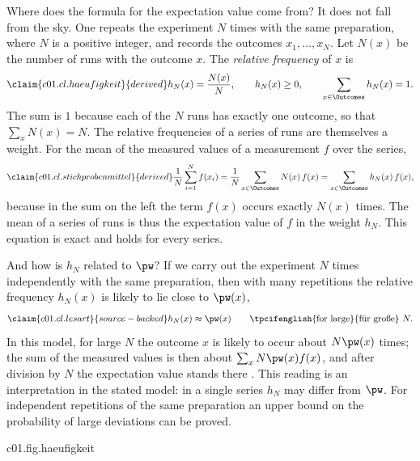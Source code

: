 Where does the formula for the expectation value come from? It does not fall from the sky.
One repeats the experiment $N$
times with the same preparation, where $N$ is a positive integer, and records the outcomes
$x_1, \dots, x_N$. Let $N(x)$ be
the number of runs with the outcome $x$. The \emph{relative frequency} of $x$ is
\begin{equation}\label{c01.eq.haeufigkeit}\claim{c01.cl.haeufigkeit}{derived}
  h_N(x) = \frac{N(x)}{N},
  \qquad
  h_N(x) \geq 0,
  \qquad
  \sum_{x \in \Outcomes} h_N(x) = 1 .
\end{equation}
The sum is $1$ because each of the $N$ runs has exactly one outcome, so that
$\sum_x N(x) = N$. The relative frequencies of a series of runs are themselves a weight.
For the mean of the measured values of a measurement $f$ over the series,
\begin{equation}\label{c01.eq.stichprobenmittel}\claim{c01.cl.stichprobenmittel}{derived}
  \frac{1}{N} \sum_{i=1}^{N} f(x_i)
  = \frac{1}{N} \sum_{x \in \Outcomes} N(x)\, f(x)
  = \sum_{x \in \Outcomes} h_N(x)\, f(x) ,
\end{equation}
because in the sum on the left the term $f(x)$ occurs exactly $N(x)$ times. The mean of a
series of runs is thus the expectation value of $f$ in the weight $h_N$. This equation is
exact and holds for every series.

And how is $h_N$ related to $\pw$? If we carry out the experiment $N$ times independently
with the same preparation, then with many repetitions the relative frequency $h_N(x)$ is
likely to lie close to $\pw(x)$,
\begin{equation}\label{c01.eq.lesart}\claim{c01.cl.lesart}{source-backed}
  h_N(x) \approx \pw(x)
  \qquad \text{\tpcifenglish{for large}{für große}}\ N .
\end{equation}
In this model, for large $N$ the outcome $x$ is likely to occur about $N \pw(x)$ times;
the sum of the measured values is then about
$\sum_x N \pw(x) f(x)$, and after division by $N$ the expectation value stands there
. This reading
is an interpretation in the stated model: in a single series $h_N$ may differ from $\pw$.
For independent repetitions of the same preparation an upper bound on the probability of
large deviations can be proved.

\begin{tpcfigure}{c01.fig.haeufigkeit}
  \caption{A series of throws with the loaded die of equation~\eqref{c01.eq.gezinkt},
    generated by a computer program with a fixed seed. Hatched bars: relative frequencies
    $h_N(x)$ after the first (a) $12$, (b) $120$ and (c) $1200$ throws of the same series.
    Heavy horizontal marks: the weights $\pw(x)$. In (a) the bars lie far from the marks,
    in (c) close to them. The bars of one picture always have total height $1$, as in
    equation~\eqref{c01.eq.haeufigkeit}.}
\end{tpcfigure}

